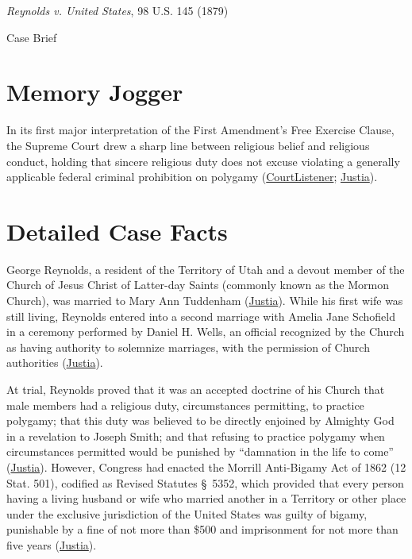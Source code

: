 \documentclass[12pt]{article}
\begin{document}
\begin{center}
{\LARGE \textit{Reynolds v. United States}, 98 U.S. 145 (1879)\par}
\vspace{0.8em}
{\large Case Brief\par}
\end{center}
\vspace{1em}

\section{Memory Jogger}

In its first major interpretation of the First Amendment's Free Exercise Clause, the Supreme Court drew a sharp line between religious belief and religious conduct, holding that sincere religious duty does not excuse violating a generally applicable federal criminal prohibition on polygamy (\href{https://www.courtlistener.com/opinion/89858/reynolds-v-united-states/}{CourtListener}; \href{https://supreme.justia.com/cases/federal/us/98/145/}{Justia}).

\section{Detailed Case Facts}

George Reynolds, a resident of the Territory of Utah and a devout member of the Church of Jesus Christ of Latter-day Saints (commonly known as the Mormon Church), was married to Mary Ann Tuddenham (\href{https://supreme.justia.com/cases/federal/us/98/145/}{Justia}). While his first wife was still living, Reynolds entered into a second marriage with Amelia Jane Schofield in a ceremony performed by Daniel H. Wells, an official recognized by the Church as having authority to solemnize marriages, with the permission of Church authorities (\href{https://supreme.justia.com/cases/federal/us/98/145/}{Justia}).

At trial, Reynolds proved that it was an accepted doctrine of his Church that male members had a religious duty, circumstances permitting, to practice polygamy; that this duty was believed to be directly enjoined by Almighty God in a revelation to Joseph Smith; and that refusing to practice polygamy when circumstances permitted would be punished by ``damnation in the life to come'' (\href{https://supreme.justia.com/cases/federal/us/98/145/}{Justia}). However, Congress had enacted the Morrill Anti-Bigamy Act of 1862 (12 Stat. 501), codified as Revised Statutes \S~5352, which provided that every person having a living husband or wife who married another in a Territory or other place under the exclusive jurisdiction of the United States was guilty of bigamy, punishable by a fine of not more than \$500 and imprisonment for not more than five years (\href{https://supreme.justia.com/cases/federal/us/98/145/}{Justia}).
\end{document}
